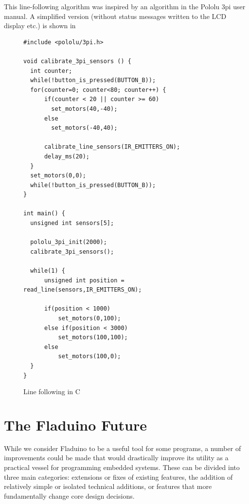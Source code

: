 \documentclass[a4paper, oneside, final]{memoir}
\let\fref\undefined
\begin{document}
This line-following algorithm was inspired by an algorithm in the
Pololu 3pi user manual. A simplified version (without status messages
written to the LCD display etc.) is shown in \fref{fig:linefollow-in-c}

\begin{figure}
  \centering
\begin{verbatim}
#include <pololu/3pi.h>

void calibrate_3pi_sensors () {
  int counter;
  while(!button_is_pressed(BUTTON_B));
  for(counter=0; counter<80; counter++) {
      if(counter < 20 || counter >= 60)
        set_motors(40,-40);
      else
        set_motors(-40,40);

      calibrate_line_sensors(IR_EMITTERS_ON);
      delay_ms(20);
  }
  set_motors(0,0);
  while(!button_is_pressed(BUTTON_B));
}

int main() {
  unsigned int sensors[5];

  pololu_3pi_init(2000);
  calibrate_3pi_sensors();

  while(1) {
      unsigned int position = read_line(sensors,IR_EMITTERS_ON);

      if(position < 1000)
          set_motors(0,100);
      else if(position < 3000) 
          set_motors(100,100);
      else 
          set_motors(100,0);
  }
}
\end{verbatim}
  \caption{Line following in C}
  \label{fig:linefollow-in-c}
\end{figure}




\chapter{The Fladuino Future}
\label{chap:futurework}

While we consider Fladuino to be a useful tool for some programs, a
number of improvements could be made that would drastically improve
its utility as a practical vessel for programming embedded systems.
These can be divided into three main categories: extensions or fixes
of existing features, the addition of relatively simple or isolated
technical additions, or features that more fundamentally change core
design decisions.
\end{document}

